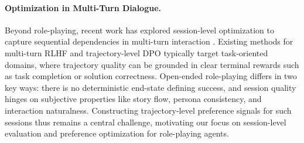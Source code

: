 \paragraph{Optimization in Multi-Turn Dialogue.}
Beyond role-playing, recent work has explored session-level optimization to capture sequential dependencies in multi-turn interaction \cite{shani2024multi, li2025beyond}. Existing methods for multi-turn RLHF \cite{gao2024regressing, zhou2024archer} and trajectory-level DPO \cite{kong2025sdpo, shi2024direct} typically target task-oriented domains, where trajectory quality can be grounded in clear terminal rewards such as task completion or solution correctness. Open-ended role-playing differs in two key ways: there is no deterministic end-state defining success, and session quality hinges on subjective properties like story flow, persona consistency, and interaction naturalness. Constructing trajectory-level preference signals for such sessions thus remains a central challenge, motivating our focus on session-level evaluation and preference optimization for role-playing agents.

